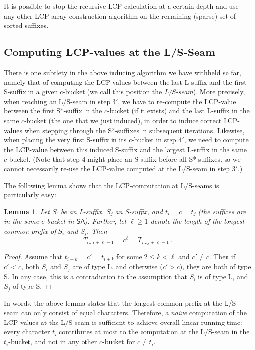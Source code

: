 \documentclass[11pt,onecolumn,final]{article} \usepackage[latin1]{inputenc}
\newcommand{\SA}[0]{\mathsf{SA}}
\newcommand{\SF}[1]{S_{#1}}
\theoremstyle{plain}
\newtheorem{lemma}[definition]{Lemma}
\theoremstyle{remark}
\begin{document}
It is possible to stop the recursive LCP-calculation at a certain depth and use any other LCP-array construction algorithm on the remaining (sparse) set of sorted suffixes.

\subsection{Computing LCP-values at the L/S-Seam}
There is one subtlety in the above inducing algorithm we have withheld so far, namely that of computing the LCP-values between the last L-suffix and the first S-suffix in a given $c$-bucket (we call this position the \emph{L/S-seam}). More precisely, when reaching an L/S-seam in step 3$'$, we have to re-compute the LCP-value between the first S*-suffix in the $c$-bucket (if it exists) and the last L-suffix in the same $c$-bucket (the one that we just induced), in order to induce correct LCP-values when stepping through the S*-suffixes in subsequent iterations. Likewise, when placing the very first S-suffix in its $c$-bucket in step 4$'$, we need to compute the LCP-value between this induced S-suffix and the largest L-suffix in the same $c$-bucket. (Note that step 4 might place an S-suffix before all S*-suffixes, so we cannot necessarily re-use the LCP-value computed at the L/S-seam in step 3$'$.)

The following lemma shows that the LCP-computation at L/S-seams is particularly easy:

\begin{lemma}
  \label{lemma:ls_seam}
  Let $\SF{i}$ be an L-suffix, $\SF{j}$ an S-suffix, and $t_i = c = t_j$ (the suffixes are in the same $c$-bucket in $\SA$). Further, let $\ell\ge 1$ denote the length of the longest common prefix of $\SF{i}$ and $\SF{j}$. Then
  $$
  T_{i\dots i+\ell - 1} = c^\ell = T_{j\dots j+\ell - 1}\ .
  $$
\end{lemma}
\begin{proof}
  Assume that $t_{i+k} = c' = t_{i+k}$ for some $2\le k < \ell$ and $c'\ne c$. Then if $c'<c$, both $\SF{i}$ and $\SF{j}$ are of type L, and otherwise ($c'>c$), they are both of type S. In any case, this is a contradiction to the assumption that $\SF{i}$ is of type L, and $\SF{j}$ of type S.
\end{proof}

In words, the above lemma states that the longest common prefix at the L/S-seam can only consist of equal characters. Therefore, a \emph{naive} computation of the LCP-values at the L/S-seam is sufficient to achieve overall linear running time: every character $t_i$ contributes at most to the computation at the L/S-seam in the $t_i$-bucket, and not in any other $c$-bucket for $c\ne t_i$.
\end{document}
